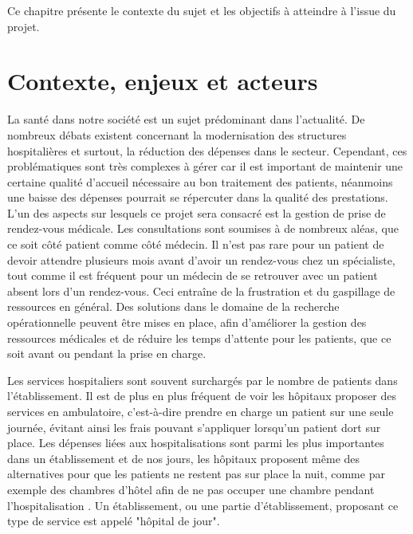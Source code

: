 \documentclass[noposter]{polytech/polytech}
\begin{document}
Ce chapitre présente le contexte du sujet et les objectifs à atteindre à l'issue du projet.

\section{Contexte, enjeux et acteurs}

La santé dans notre société est un sujet prédominant dans l'actualité. De nombreux débats existent concernant la modernisation des structures hospitalières et surtout, la réduction des dépenses dans le secteur. Cependant, ces problématiques sont très complexes à gérer car il est important de maintenir une certaine qualité d'accueil nécessaire au bon traitement des patients, néanmoins une baisse des dépenses pourrait se répercuter dans la qualité des prestations. L'un des aspects sur lesquels ce projet sera consacré est la gestion de prise de rendez-vous médicale. Les consultations sont soumises à de nombreux aléas, que ce soit côté patient comme côté médecin. Il n'est pas rare pour un patient de devoir attendre plusieurs mois avant d'avoir un rendez-vous chez un spécialiste, tout comme il est fréquent pour un médecin de se retrouver avec un patient absent lors d'un rendez-vous. Ceci entraîne de la frustration et du gaspillage de ressources en général. Des solutions dans le domaine de la recherche opérationnelle peuvent être mises en place, afin d'améliorer la gestion des ressources médicales et de réduire les temps d'attente pour les patients, que ce soit avant ou pendant la prise en charge. 

Les services hospitaliers sont souvent surchargés par le nombre de patients dans l'établissement. Il est de plus en plus fréquent de voir les hôpitaux proposer des services en ambulatoire, c'est-à-dire prendre en charge un patient sur une seule journée, évitant ainsi les frais pouvant s'appliquer lorsqu'un patient dort sur place. Les dépenses liées aux hospitalisations sont parmi les plus importantes dans un établissement et de nos jours, les hôpitaux proposent même des alternatives pour que les patients ne restent pas sur place la nuit, comme par exemple des chambres d'hôtel afin de ne pas occuper une chambre pendant l'hospitalisation \cite{noauthor_chu_nodate}. Un établissement, ou une partie d'établissement, proposant ce type de service est appelé "hôpital de jour".
\end{document}
